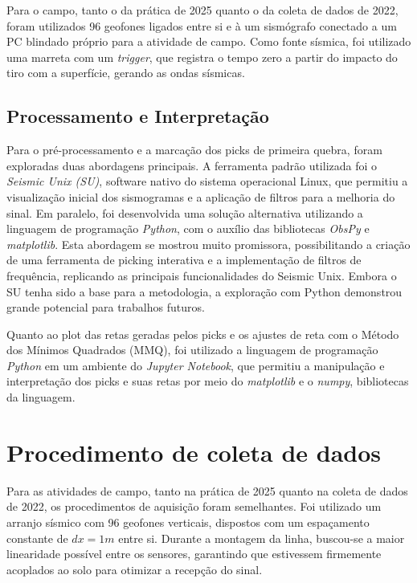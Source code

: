 \documentclass[a4paper,12pt]{article}
\begin{document}
Para o campo, tanto o da prática de 2025 quanto o da coleta de dados de 2022, foram utilizados 96 geofones ligados entre si e à um sismógrafo conectado a um PC blindado próprio para a atividade de campo. Como fonte sísmica, foi utilizado uma marreta com um \textit{trigger}, que registra o tempo zero a partir do impacto do tiro com a superfície, gerando as ondas sísmicas. 

\subsection{Processamento e Interpretação}

Para o pré-processamento e a marcação dos picks de primeira quebra, foram exploradas duas abordagens principais. A ferramenta padrão utilizada foi o \textit{Seismic Unix (SU)}, software nativo do sistema operacional Linux, que permitiu a visualização inicial dos sismogramas e a aplicação de filtros para a melhoria do sinal. Em paralelo, foi desenvolvida uma solução alternativa utilizando a linguagem de programação \textit{Python}, com o auxílio das bibliotecas \textit{ObsPy} e \textit{matplotlib}. Esta abordagem se mostrou muito promissora, possibilitando a criação de uma ferramenta de picking interativa e a implementação de filtros de frequência, replicando as principais funcionalidades do Seismic Unix. Embora o SU tenha sido a base para a metodologia, a exploração com Python demonstrou grande potencial para trabalhos futuros.

Quanto ao plot das retas geradas pelos picks e os ajustes de reta com o Método dos Mínimos Quadrados (MMQ), foi utilizado a linguagem de programação \textit{Python} em um ambiente do \textit{Jupyter Notebook}, que permitiu a manipulação e interpretação dos picks e suas retas por meio do \textit{matplotlib} e o \textit{numpy}, bibliotecas da linguagem. 


\section{Procedimento de coleta de dados}

Para as atividades de campo, tanto na prática de 2025 quanto na coleta de dados de 2022, os procedimentos de aquisição foram semelhantes. Foi utilizado um arranjo sísmico com 96 geofones verticais, dispostos com um espaçamento constante de $dx=1m$ entre si. Durante a montagem da linha, buscou-se a maior linearidade possível entre os sensores, garantindo que estivessem firmemente acoplados ao solo para otimizar a recepção do sinal.
\end{document}

